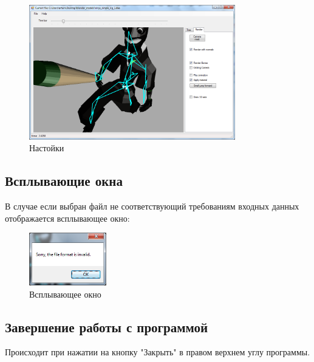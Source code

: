 \begin{figure}[h!]
    \centering
    \includegraphics[width=0.8\textwidth]{../screenshots/interface_map.png}
    \caption{Настойки}
\end{figure}


\subsection{Всплывающие окна}
В случае если выбран файл не соответствующий требованиям входных данных отображается всплывающее окно:

\begin{figure}[h!]
    \centering
    \includegraphics[width=0.3\textwidth]{../screenshots/error_message.png}
    \caption{Всплывающее окно}
\end{figure}


\subsection{Завершение работы с программой}
Происходит при нажатии на кнопку "Закрыть" в правом верхнем углу программы.

